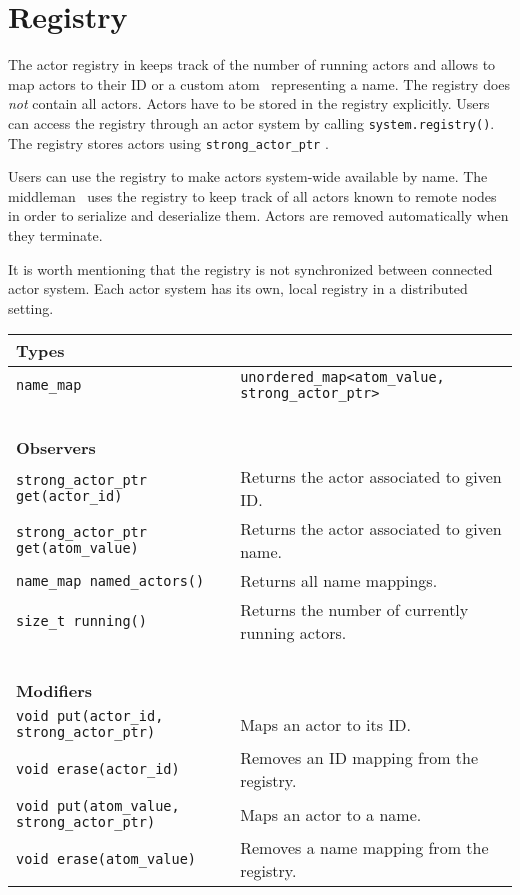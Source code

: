 \section{Registry}
\label{registry}

The actor registry in \lib keeps track of the number of running actors and
allows to map actors to their ID or a custom atom~ representing a
name. The registry does \emph{not} contain all actors. Actors have to be stored
in the registry explicitly. Users can access the registry through an actor
system by calling \lstinline^system.registry()^. The registry stores actors
using \lstinline^strong_actor_ptr^ .

Users can use the registry to make actors system-wide available by name. The
middleman~ uses the registry to keep track of all actors known
to remote nodes in order to serialize and deserialize them. Actors are removed
automatically when they terminate.

It is worth mentioning that the registry is not synchronized between connected
actor system. Each actor system has its own, local registry in a distributed
setting.

\begin{center}
\begin{tabular}{ll}
  \textbf{Types} & ~ \\
  \hline
  \lstinline^name_map^ & \lstinline^unordered_map<atom_value, strong_actor_ptr>^ \\
  \hline
  ~ & ~ \\ \textbf{Observers} & ~ \\
  \hline
  \lstinline^strong_actor_ptr get(actor_id)^ & Returns the actor associated to given ID. \\
  \hline
  \lstinline^strong_actor_ptr get(atom_value)^ & Returns the actor associated to given name. \\
  \hline
  \lstinline^name_map named_actors()^ & Returns all name mappings. \\
  \hline
  \lstinline^size_t running()^ & Returns the number of currently running actors. \\
  \hline
  ~ & ~ \\ \textbf{Modifiers} & ~ \\
  \hline
  \lstinline^void put(actor_id, strong_actor_ptr)^ & Maps an actor to its ID. \\
  \hline
  \lstinline^void erase(actor_id)^ & Removes an ID mapping from the registry. \\
  \hline
  \lstinline^void put(atom_value, strong_actor_ptr)^ & Maps an actor to a name. \\
  \hline
  \lstinline^void erase(atom_value)^ & Removes a name mapping from the registry. \\
  \hline
\end{tabular}
\end{center}
